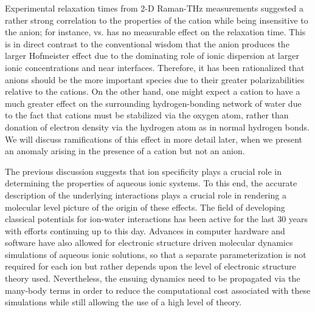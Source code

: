 \documentclass[11pt, proquest]{uwthesis}[2020/02/24]
\let\ce\ch
\begin{document}
\par Experimental relaxation times from 2-D Raman-THz measurements suggested a rather strong correlation to the properties of the cation while being insensitive to the anion; for instance, \ce{SrCl2} vs. \ce{SrBr2} has no measurable effect on the relaxation time.\autocite{shalit_terahertz_2017} This is in direct contrast to the conventional wisdom that the anion produces the larger Hofmeister effect due to the dominating role of ionic dispersion at larger ionic concentrations and near interfaces.\autocite{bostrom_why_2004,jungwirth_molecular_2001,jungwirth_ions_2002,dang_molecular_2002,garrett_ions_2004} Therefore, it has been rationalized that anions should be the more important species due to their greater polarizabilities relative to the cations.\autocite{yang_hofmeister_2009} On the other hand, one might expect a cation to have a much greater effect on the surrounding hydrogen-bonding network of water due to the fact that cations must be stabilized via the oxygen atom, rather than donation of electron density via the hydrogen atom as in normal hydrogen bonds.\autocite{kwan_effect_2019} We will discuss ramifications of this effect in more detail later, when we present an anomaly arising in the presence of a cation but not an anion.

\par The previous discussion suggests that ion specificity plays a crucial role in determining the properties of aqueous ionic systems. To this end, the accurate description of the underlying interactions plays a crucial role in rendering a molecular level picture of the origin of these effects. The field of developing classical potentials for ion-water interactions has been active for the last 30 years\autocite{probst_molecular_1985,limtrakul_solvent_1985,probst_study_1987,amira_molecular_2004,wick_computational_2009,wick_molecular_2008} with efforts continuing up to this day.\autocite{arismendi-arrieta_i-ttm_2015,bajaj_toward_2016,riera_i-ttm_2016} Advances in computer hardware and software have also allowed for electronic structure driven molecular dynamics\autocite{car_unified_1985,kuhne_second_2014} simulations of aqueous ionic solutions,\autocite{todorova_carparrinello_2008,bako_carparrinello_2002,bankura_hydration_2013,baer_local_2016,duignan_quantifying_2020} so that a separate parameterization is not required for each ion but rather depends upon the level of electronic structure theory used. Nevertheless, the ensuing dynamics need to be propagated via the many-body terms in order to reduce the computational cost associated with these simulations while still allowing the use of a high level of theory.\autocite{liu_hydrogen-bond_2018,liu_variational_2019} 
\end{document}
